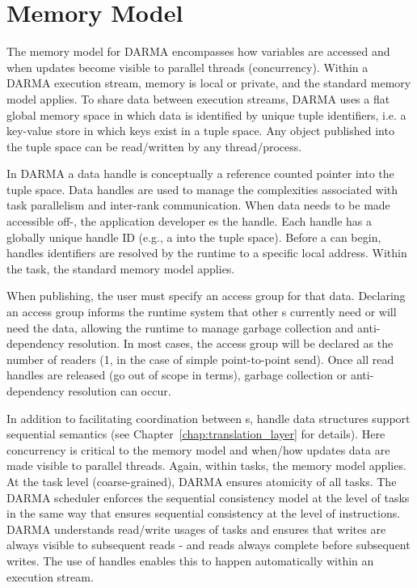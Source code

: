 
\section{Memory Model}
\label{sec:mem_model}
The memory model for \gls{DARMA} encompasses how variables are accessed %
  and when updates become visible to parallel threads (concurrency).  
Within a \gls{DARMA} execution stream, memory is local or private, and the
standard \CC{} memory model applies. 
To share data between execution streams, \gls{DARMA} uses a flat global memory space in
which data is identified by unique \gls{tuple} identifiers, i.e. a \gls{key-value
  store} in which keys exist in a \gls{tuple space}.
Any object published into the \gls{tuple space} can be read/written by any thread/process. 

In \gls{DARMA} a data \gls{handle} is conceptually a \gls{reference counted pointer} into the
\gls{tuple space}.  
Data \glspl{handle} are used to manage the
complexities associated with \gls{task parallelism} and inter-\gls{rank} communication.  
When data needs to be made accessible off-, the application developer 
es the \gls{handle}.  Each \gls{handle} has a globally unique handle ID
(e.g., a  into the \gls{tuple space}).  
Before a  can begin, \glspl{handle} identifiers are resolved by the runtime to a
specific local address. Within the task, the standard \CC{} memory model applies.

When publishing, the user must specify an \gls{access group} for that data.  
Declaring an \gls{access group} informs the \gls{runtime system} that other
s currently need or will need the data,  
allowing the runtime to manage garbage collection and \gls{anti-dependency} resolution.
In most cases, the \gls{access group} will be declared as the number of readers (1, in the case of simple point-to-point send).
Once all read \glspl{handle} are released (go out of scope in \CC{} terms),
\gls{garbage collection} or \gls{anti-dependency} resolution can occur.


In addition to facilitating coordination between s, \gls{handle} data structures 
support \gls{sequential semantics} (see Chapter~\ref{chap:translation_layer} for details).
Here concurrency is critical to the \gls{memory model} and when/how updates data are made visible to parallel threads.  
Again, within tasks, the \CC{} \gls{memory model} applies. 
At the task level (coarse-grained), \gls{DARMA} ensures atomicity of all tasks. 
The \gls{DARMA} scheduler enforces the \CC{} sequential consistency model at
the level of tasks in the same way that \CC{} ensures sequential consistency at the level of instructions. 
\gls{DARMA} understands read/write usages of tasks and ensures that writes are always visible to subsequent reads - and reads always complete before subsequent writes.  
The use of \glspl{handle} enables this to happen automatically within an execution stream.




